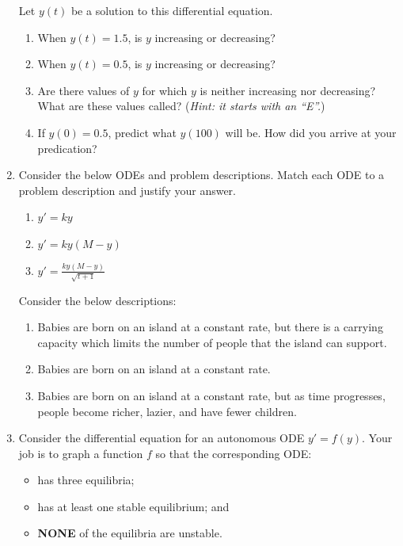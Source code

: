 \begin{enumerate}
    Let $y(t)$ be a solution to this differential equation.

    \begin{enumerate}
        \item When $y(t)=1.5$, is $y$ increasing or decreasing? 
        \item When $y(t)=0.5$, is $y$ increasing or decreasing?
        \item Are there values of $y$ for which $y$ is neither increasing nor decreasing? What are these values called? (\emph{Hint: it starts with an ``E''.})
        \item If $y(0)=0.5$, predict what $y(100)$ will be. How did you arrive at your predication?
    \end{enumerate}

    \item Consider the below ODEs and problem descriptions. Match each ODE to a problem description and justify your answer.
    \begin{tcolorbox}[sharp corners=all,colframe=tolGrey,colback=white]
        \begin{multicols}{2}
        \begin{enumerate}[label={(\roman{enumii})},nosep,itemsep=1mm]
            \item $y'=ky$
            \item $y'=ky(M-y)$
            \item $y'=\frac{ky(M-y)}{\sqrt{t+1}}$
        \end{enumerate}
        \end{multicols}
    \end{tcolorbox}

    Consider the below descriptions:
    \begin{enumerate}
        \item Babies are born on an island at a constant rate, but there is a carrying capacity which limits the number of people that the island can support.
        \item Babies are born on an island at a constant rate.
        \item Babies are born on an island at a constant rate, but as time progresses, people become richer, lazier, and have fewer children.
    \end{enumerate}


    \item Consider the differential equation for an autonomous ODE $y'=f(y)$.
    Your job is to graph a function $f$ so that the corresponding ODE:
    \begin{itemize}[nosep]
        \item has three equilibria;
        \item has at least one stable equilibrium; and
        \item \textbf{NONE} of the equilibria are unstable.
    \end{itemize}


\end{enumerate}
